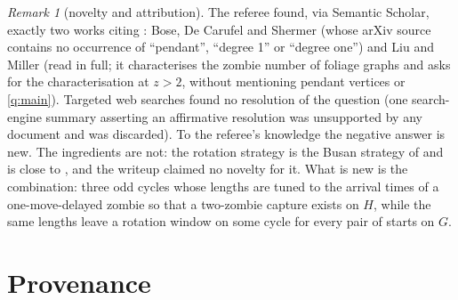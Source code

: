 \documentclass[11pt,a4paper]{article}
\theoremstyle{plain}
\theoremstyle{definition}
\theoremstyle{remark}
\newtheorem{remark}[theorem]{Remark}
\begin{document}
\begin{remark}[novelty and attribution]\label{rem:novelty}
The referee found, via Semantic Scholar, exactly two works citing \cite{BBBLN21}: Bose, De Carufel and Shermer \cite{BDS22} (whose arXiv source contains no occurrence of ``pendant'', ``degree 1'' or ``degree one'') and Liu and Miller \cite{LM26} (read in full; it characterises the zombie number of foliage graphs and asks for the characterisation at $z>2$, without mentioning pendant vertices or \cref{q:main}). Targeted web searches found no resolution of the question (one search-engine summary asserting an affirmative resolution was unsupported by any document and was discarded). To the referee's knowledge the negative answer is new. The ingredients are not: the rotation strategy is the Busan strategy of \cite[Section~3]{BBBLN21} and is close to \cite[Lemma~1]{LM26}, and the writeup claimed no novelty for it. What is new is the combination: three odd cycles whose lengths are tuned to the arrival times of a one-move-delayed zombie so that a two-zombie capture exists on $H$, while the same lengths leave a rotation window on some cycle for every pair of starts on $G$.
\end{remark}

\section{Provenance}\label{sec:provenance}
\end{document}
